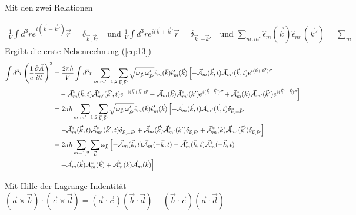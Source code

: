 Mit den zwei Relationen

\begin{align}
  \label{eq:14}
  \frac{1}{V}\int d^3 r e^{i(\vec k - \vec k')}\vec r = \delta_{\vec k,\vec k'} \quad\text{und }  \frac{1}{V}\int d^3 r e^{i(\vec k +\vec k'}\vec r = \delta_{\vec k, - \vec k'}\quad \text{und } \sum_{m,m'}\hat\epsilon_m(\vec k)\hat\epsilon_{m'}(\vec k') = \sum_{m}
\end{align}
Ergibt die erste Nebenrechnung (\ref{eq:13})
\begin{align}
  \label{eq:15}
  \int d^3r  \left( \frac{1}{c} \pdiff{\vec A}_t \right)^2 &=  \frac{2\pi\hbar}{V} \int d^3r  \sum_{m,m'=1,2} \sum_{\vec k,\vec k'}   \sqrt{\omega_{\vec k'}\omega'_{\vec k'}} \hat \epsilon_m(\vec k) \hat \epsilon'_m(\vec k)  
\left[ -\vec{\mathcal A}_m (\vec k,t) \vec{\mathcal A}_{m'} (\vec k,t)e^{i(\vec k+\vec k')\vec r}  \right. \notag\\
&\quad - \vec{\mathcal A}^*_m (\vec k,t) \vec{\mathcal A}^*_{m'} (\vec k',t) e^{-i(\vec k+\vec k')\vec r} 
+ \left.\vec{\mathcal A}_{m} (\vec k)  \vec{\mathcal A}^*_{m'} (k') e^{i(\vec k-\vec k')\vec r} 
 + \vec{\mathcal A}^*_m (k) \vec{\mathcal A}_{m'} (\vec k') e^{i(\vec k'-\vec k)\vec r}    \right] \notag\\
%
&=  2\pi\hbar \sum_{m,m'=1,2} \sum_{\vec k,\vec k'}   \sqrt{\omega_{\vec k'}\omega'_{\vec k'}} \hat \epsilon_m(\vec k) \hat \epsilon'_m(\vec k)  
\left[- \vec{\mathcal A}_m (\vec k,t) \vec{\mathcal A}_{m'} (\vec k,t)\delta_{\vec k,-\vec k'}    \right. \notag\\
&\quad\left. - \vec{\mathcal A}^*_m (\vec k,t) \vec{\mathcal A}^*_{m'} (\vec k',t) \delta_{\vec k, - \vec k'} 
+ \vec{\mathcal A}_{m} (\vec k)  \vec{\mathcal A}^*_{m'} (k')  \delta_{\vec k,\vec k'}
 + \vec{\mathcal A}^*_m (k) \vec{\mathcal A}_{m'} (\vec k')    \delta_{\vec k,\vec k'}  \right] \notag\\
%
&=  2\pi\hbar \sum_{m=1,2} \sum_{\vec k} \omega_{\vec k}  
\left[ - \vec{\mathcal A}_m (\vec k,t) \vec{\mathcal A}_{m} (- \vec k,t) -
  \vec{\mathcal A}^*_m (\vec k,t) \vec{\mathcal A}^*_{m} (- \vec k,t)  \right.\notag\\
&\quad\left. + \vec{\mathcal A}_{m} (\vec k)  \vec{\mathcal A}^*_{m} (\vec k) 
 + \vec{\mathcal A}^*_m (k) \vec{\mathcal A}_{m} (\vec k)  \right] \notag\\
\end{align}




Mit Hilfe der Lagrange Indentität \((\vec a\times\vec b)\cdot(\vec c\times\vec d) = (\vec a\cdot\vec c)(\vec b\cdot\vec d) - (\vec b \cdot \vec c)(\vec a\cdot\vec d) \)

